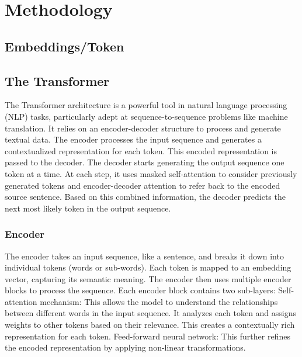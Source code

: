 \chapter{Methodology}



\section{Embeddings/Token}



\section{The Transformer}
The Transformer architecture is a powerful tool in natural language processing (NLP) tasks, particularly adept at sequence-to-sequence problems like machine translation. It relies on an encoder-decoder structure to process and generate textual data.
The encoder processes the input sequence and generates a contextualized representation for each token.
This encoded representation is passed to the decoder.
The decoder starts generating the output sequence one token at a time.
At each step, it uses masked self-attention to consider previously generated tokens and encoder-decoder attention to refer back to the encoded source sentence.
Based on this combined information, the decoder predicts the next most likely token in the output sequence.

\subsection{Encoder}

The encoder takes an input sequence, like a sentence, and breaks it down into individual tokens (words or sub-words).
Each token is mapped to an embedding vector, capturing its semantic meaning.
The encoder then uses multiple encoder blocks to process the sequence.
Each encoder block contains two sub-layers:
Self-attention mechanism: This allows the model to understand the relationships between different words in the input sequence. It analyzes each token and assigns weights to other tokens based on their relevance. This creates a contextually rich representation for each token.
Feed-forward neural network: This further refines the encoded representation by applying non-linear transformations.


